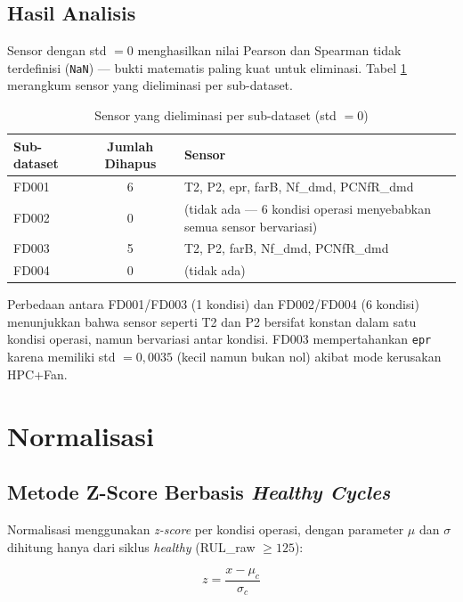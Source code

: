\documentclass[11pt,a4paper]{article}
\begin{document}
\subsection{Hasil Analisis}

Sensor dengan std $= 0$ menghasilkan nilai Pearson dan Spearman tidak terdefinisi
(\texttt{NaN}) --- bukti matematis paling kuat untuk eliminasi. Tabel \ref{tab:drop}
merangkum sensor yang dieliminasi per sub-dataset.

\begin{table}[H]
\centering
\small
\caption{Sensor yang dieliminasi per sub-dataset (std $= 0$)}
\label{tab:drop}
\begin{tabular}{lcp{7cm}}
\toprule
Sub-dataset & Jumlah Dihapus & Sensor \\
\midrule
FD001 & 6 & T2, P2, epr, farB, Nf\_dmd, PCNfR\_dmd \\
FD002 & 0 & (tidak ada --- 6 kondisi operasi menyebabkan semua sensor bervariasi) \\
FD003 & 5 & T2, P2, farB, Nf\_dmd, PCNfR\_dmd \\
FD004 & 0 & (tidak ada) \\
\bottomrule
\end{tabular}
\end{table}

Perbedaan antara FD001/FD003 (1 kondisi) dan FD002/FD004 (6 kondisi) menunjukkan
bahwa sensor seperti T2 dan P2 bersifat konstan dalam satu kondisi operasi, namun
bervariasi antar kondisi. FD003 mempertahankan \texttt{epr} karena memiliki
std $= 0{,}0035$ (kecil namun bukan nol) akibat mode kerusakan HPC+Fan.

\section{Normalisasi}

\subsection{Metode Z-Score Berbasis \textit{Healthy Cycles}}

Normalisasi menggunakan \textit{z-score} per kondisi operasi, dengan parameter
$\mu$ dan $\sigma$ dihitung hanya dari siklus \textit{healthy} (RUL\_raw $\geq 125$):

\begin{equation}
  z = \frac{x - \mu_c}{\sigma_c}
\end{equation}
\end{document}
